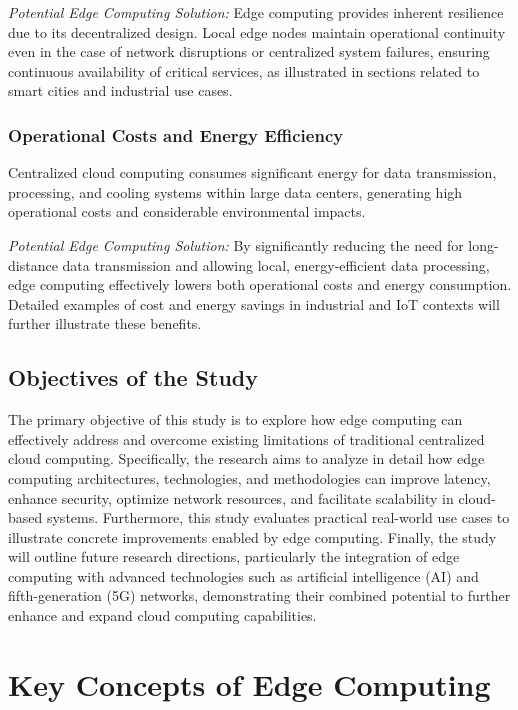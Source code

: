 \documentclass[runningheads]{llncs}
\begin{document}
\textit{Potential Edge Computing Solution:} Edge computing provides inherent resilience due to its decentralized design. Local edge nodes maintain operational continuity even in the case of network disruptions or centralized system failures, ensuring continuous availability of critical services, as illustrated in sections related to smart cities and industrial use cases.

\subsubsection{Operational Costs and Energy Efficiency}
Centralized cloud computing consumes significant energy for data transmission, processing, and cooling systems within large data centers, generating high operational costs and considerable environmental impacts.

\textit{Potential Edge Computing Solution:} By significantly reducing the need for long-distance data transmission and allowing local, energy-efficient data processing, edge computing effectively lowers both operational costs and energy consumption. Detailed examples of cost and energy savings in industrial and IoT contexts will further illustrate these benefits.

\subsection{Objectives of the Study}

The primary objective of this study is to explore how edge computing can effectively address and overcome existing limitations of traditional centralized cloud computing. Specifically, the research aims to analyze in detail how edge computing architectures, technologies, and methodologies can improve latency, enhance security, optimize network resources, and facilitate scalability in cloud-based systems. Furthermore, this study evaluates practical real-world use cases to illustrate concrete improvements enabled by edge computing. Finally, the study will outline future research directions, particularly the integration of edge computing with advanced technologies such as artificial intelligence (AI) and fifth-generation (5G) networks, demonstrating their combined potential to further enhance and expand cloud computing capabilities.


\section{Key Concepts of Edge Computing}
\end{document}
